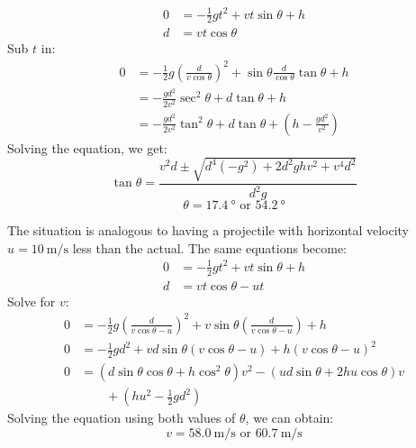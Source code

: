 \begin{solution}
\begin{subsolution}
\begin{center}
        \end{center}
    
        \begin{align}
            0 &= -\frac{1}{2}gt^2 + vt\sin\theta + h \\
            d &= vt\cos\theta 
        \end{align}
        Sub $t$ in:
        \begin{align}
        0 &= -\frac{1}{2}g\left(\frac{d}{v\cos\theta}\right)^2 + \sin\theta\frac{d}{\cos\theta} \tan\theta + h \\
        &= -\frac{gd^2}{2v^2}\sec^2\theta  + d\tan\theta + h \\
        &= -\frac{gd^2}{2v^2} \tan^2\theta + d\tan\theta + \left(h -\frac{gd^2}{v^2}\right)
        \end{align}
        Solving the equation, we get:
        \[\tan\theta = \frac{v^2 d\pm \sqrt{d^4 \left(-g^2\right)+2 d^2 g h v^2+v^4d^2}}{d^2 g}\]
        \[\theta = \boxed{\qty{17.4}{\degree} \text{ or } \qty{54.2}{\degree}}\]
    \end{subsolution}
    \begin{subsolution}
        The situation is analogous to having a projectile with horizontal velocity $u=\qty{10}{\m\per\s}$ less than the actual. The same equations become: 
        \begin{align}
            0 &= -\frac{1}{2}gt^2 + vt\sin\theta + h \\
            d &= vt\cos\theta - ut
        \end{align}
        Solve for $v$: 
        \begin{align*}
            0 &= -\frac{1}{2}g\left(\frac{d}{v\cos\theta-u}\right)^2 + v\sin\theta\left(\frac{d}{v\cos\theta-u}\right) + h\\
            0 &= -\frac{1}{2}gd^2 + vd\sin\theta\left(v\cos\theta-u\right) + h(v\cos\theta-u)^2\\
            0 &= (d\sin\theta\cos\theta+h\cos^2\theta)v^2 - (ud\sin\theta+2hu\cos\theta)v\\
            &\qquad+ \left(hu^2-\frac{1}{2}gd^2\right)
        \end{align*}
        Solving the equation using both values of $\theta$, we can obtain:
        \[v=\boxed{\qty{58.0}{\m\per\s}\text{ or }\qty{60.7}{\m\per\s}}\]
    \end{subsolution}
\end{solution}

